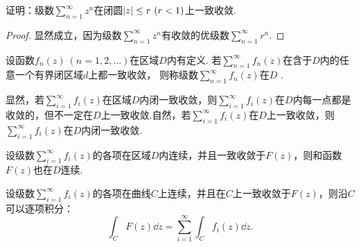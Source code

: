 \begin{example}
证明：级数\(\sum_{n=1}^\infty z^n\)在闭圆\(\abs{z} \leq r\ (r<1)\)上一致收敛.
\begin{proof}
显然成立，因为级数\(\sum_{n=1}^\infty z^n\)有收敛的优级数\(\sum_{n=1}^\infty r^n\).
\end{proof}
\end{example}

\begin{definition}
设函数\(f_n(z)\ (n=1,2,\dots)\)在区域\(D\)内有定义.
若\(\sum_{n=1}^\infty f_n(z)\)在含于\(D\)内的任意一个有界闭区域\(d\)上都一致收敛，
则称级数\(\sum_{n=1}^\infty f_n(z)\)在\(D\) .
\end{definition}
显然，若\(\sum_{i=1}^\infty f_i(z)\)在区域\(D\)内闭一致收敛，则\(\sum_{i=1}^\infty f_i(z)\)在\(D\)内每一点都是收敛的，但不一定在\(D\)上一致收敛.自然，若\(\sum_{i=1}^\infty f_i(z)\)在\(D\)上一致收敛，则\(\sum_{i=1}^\infty f_i(z)\)在\(D\)内闭一致收敛.

\begin{theorem}\label{theorem:解析函数的级数表示.一致收敛级数的基本性质1}
设级数\(\sum_{i=1}^\infty f_i(z)\)的各项在区域\(D\)内连续，并且一致收敛于\(F(z)\)，则和函数\(F(z)\)也在\(D\)连续.
\end{theorem}

\begin{theorem}\label{theorem:解析函数的级数表示.一致收敛级数的基本性质2}
设级数\(\sum_{i=1}^\infty f_i(z)\)的各项在曲线\(C\)上连续，并且在\(C\)上一致收敛于\(F(z)\)，则沿\(C\)可以逐项积分：\[
\int_C F(z) \dd{z}
= \sum_{i=1}^\infty \int_C f_i(z) \dd{z}.
\]
\end{theorem}

